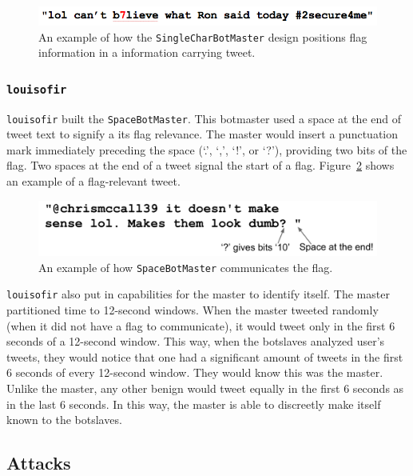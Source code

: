 \documentclass[11pt, oneside]{article} %
\numberwithin{equation}{section} %
\numberwithin{figure}{section} %
\numberwithin{table}{section} %
\renewcommand{\c}[1]{\texttt{#1}}
\newcommand{\teamol}{\c{louisofir}}
\begin{document}
		 \begin{figure}[H]
		    \center\includegraphics[scale=0.60]{resources/prng-tweet-ex.png}
		    \caption{An example of how the \c{SingleCharBotMaster} design positions flag information in a information carrying tweet.}
		    \label{fig:prng-tweet-ex}
		 \end{figure}
		
			
		\subsubsection{\teamol{}}
			\teamol{} built the \c{SpaceBotMaster}. This botmaster used a space at the end of tweet text to signify a its flag relevance. The master would insert a punctuation mark immediately preceding the space (`.', `,', `!', or `?'), providing two bits of the flag. Two spaces at the end of a tweet signal the start of a flag. Figure~\ref{fig:spacebot} shows an example of a flag-relevant tweet.
            
            \begin{figure}[H]
		    \center\includegraphics[scale=0.60]{resources/spacebot.png}
		    \caption{An example of how \c{SpaceBotMaster} communicates the flag.}
		    \label{fig:spacebot}
		 \end{figure}

			\teamol{} also put in capabilities for the master to identify itself. The master partitioned time to 12-second windows. When the master tweeted randomly (when it did not have a flag to communicate), it would tweet only in the first 6 seconds of a 12-second window. This way, when the botslaves analyzed user's tweets, they would notice that one had a significant amount of tweets in the first 6 seconds of every 12-second window. They would know this was the master. Unlike the master, any other benign would tweet equally in the first 6 seconds as in the last 6 seconds. In this way, the master is able to discreetly make itself known to the botslaves.

	\subsection{Attacks}
\end{document}

